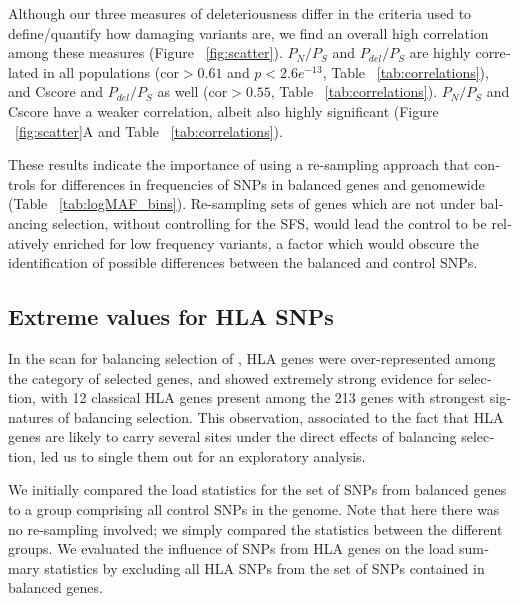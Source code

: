 \begin{refsection}
\begin{otherlanguage}{english}
Although our three measures of deleteriousness differ in the criteria used to define/quantify how damaging variants are, we find an overall high correlation among these measures (Figure ~\ref{fig:scatter}). $P_{N}/P_{S}$ and $P_{del}/P_{S}$ are highly correlated in all populations (cor$>0.61$ and $p<2.6e^{-13}$, Table ~\ref{tab:correlations}), and Cscore and $P_{del}/P_{S}$ as well (cor$>0.55$, Table ~\ref{tab:correlations}). $P_{N}/P_{S}$ and Cscore have a weaker correlation, albeit also highly significant (Figure ~\ref{fig:scatter}A and Table ~\ref{tab:correlations}).

These results indicate the importance of using a re-sampling approach that controls for differences in frequencies of SNPs in balanced genes and genomewide (Table ~\ref{tab:logMAF_bins}). Re-sampling sets of genes which are not under balancing selection, without controlling for the SFS, would lead the control to be relatively enriched for low frequency variants, a factor which would obscure the identification of possible differences between the balanced and control SNPs.


\afterpage{\FloatBarrier}
\afterpage{\clearpage}
\subsection{Extreme values for HLA SNPs} 

In the scan for balancing selection of \textcite{Bitarello2016}, HLA genes were over-represented among the category of selected genes, and showed extremely strong evidence for selection, with 12 classical HLA genes present among the 213 genes with strongest signatures of balancing selection. This observation, associated to the fact that HLA genes are likely to carry several sites under the direct effects of balancing selection, led us to single them out for an exploratory analysis. %

We initially compared the load statistics for the set of SNPs from balanced genes to a group comprising all control SNPs in the genome. Note that here there was no re-sampling involved; we simply compared the statistics between the different groups. We evaluated the influence of SNPs from HLA genes on the load summary statistics by excluding all HLA SNPs from the set of SNPs contained in balanced genes.


\end{otherlanguage}
\end{refsection}
